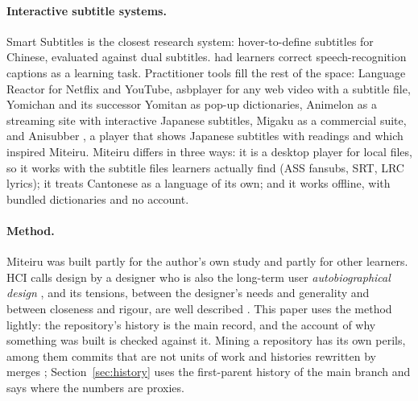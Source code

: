 ﻿\documentclass[11pt,a4paper]{article}
\begin{document}
\paragraph{Interactive subtitle systems.}
Smart Subtitles \citep{kovacs2014smart} is the closest research system: hover-to-define subtitles for Chinese, evaluated against dual subtitles. \citet{culbertson2017have} had learners correct speech-recognition captions as a learning task. Practitioner tools fill the rest of the space: Language Reactor \citep{languagereactor} for Netflix and YouTube, asbplayer \citep{asbplayer} for any web video with a subtitle file, Yomichan and its successor Yomitan \citep{yomichan,yomitan} as pop-up dictionaries, Animelon \citep{animelon} as a streaming site with interactive Japanese subtitles, Migaku \citep{migaku} as a commercial suite, and Anisubber \citep{anisubber}, a player that shows Japanese subtitles with readings and which inspired Miteiru. Miteiru differs in three ways: it is a desktop player for local files, so it works with the subtitle files learners actually find (ASS fansubs, SRT, LRC lyrics); it treats Cantonese as a language of its own; and it works offline, with bundled dictionaries and no account.

\paragraph{Method.}
Miteiru was built partly for the author's own study and partly for other learners. HCI calls design by a designer who is also the long-term user \emph{autobiographical design} \citep{neustaedter2012autobiographical}, and its tensions, between the designer's needs and generality and between closeness and rigour, are well described \citep{desjardins2018revealing}. This paper uses the method lightly: the repository's history is the main record, and the account of why something was built is checked against it. Mining a repository has its own perils, among them commits that are not units of work and histories rewritten by merges \citep{kalliamvakou2014promises}; Section~\ref{sec:history} uses the first-parent history of the main branch and says where the numbers are proxies.
\end{document}
